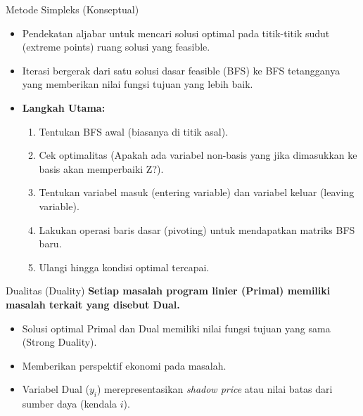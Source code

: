 \documentclass[aspectratio=169]{beamer}
\begin{document}
\begin{frame}{Metode Simpleks (Konseptual)}
    \begin{itemize}
        \item Pendekatan aljabar untuk mencari solusi optimal pada titik-titik sudut (extreme points) ruang solusi yang feasible.
        \item Iterasi bergerak dari satu solusi dasar feasible (BFS) ke BFS tetangganya yang memberikan nilai fungsi tujuan yang lebih baik.
        \item \textbf{Langkah Utama:}
        \begin{enumerate}
            \item Tentukan BFS awal (biasanya di titik asal).
            \item Cek optimalitas (Apakah ada variabel non-basis yang jika dimasukkan ke basis akan memperbaiki Z?).
            \item Tentukan variabel masuk (entering variable) dan variabel keluar (leaving variable).
            \item Lakukan operasi baris dasar (pivoting) untuk mendapatkan matriks BFS baru.
            \item Ulangi hingga kondisi optimal tercapai.
        \end{enumerate}
    \end{itemize}
\end{frame}

\begin{frame}{Dualitas (Duality)}
    \textbf{Setiap masalah program linier (Primal) memiliki masalah terkait yang disebut Dual.}
    \vspace{0.3cm}
    \begin{itemize}
        \item Solusi optimal Primal dan Dual memiliki nilai fungsi tujuan yang sama (Strong Duality).
        \item Memberikan perspektif ekonomi pada masalah.
        \item Variabel Dual ($y_i$) merepresentasikan \textit{shadow price} atau nilai batas dari sumber daya (kendala $i$).
    \end{itemize}
\end{frame}
\end{document}
